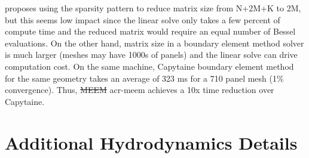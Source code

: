 \documentclass[a4paper,fleqn,colorlinks,unicode,lineno]{cas-dc} %
\makeatletter
\providecommand{\DIFdeltex}[1]{{\protect\color{red}\sout{#1}}} %
\providecommand{\DIFaddbegin}{} %
\providecommand{\DIFaddend}{} %
\providecommand{\DIFdelbegin}{} %
\providecommand{\DIFdelend}{} %
\providecommand{\DIFdel}[1]{\texorpdfstring{\DIFdeltex{#1}}{}} %
\providecommand{\DIFscaledelfig}{0.5}
\newlength{\DIFdelgraphicswidth} %
\newlength{\DIFdelgraphicsheight} %
\providecommand{\DIFaddincludegraphics}[2][]{{\color{blue}\fbox{\DIFOincludegraphics[#1]{#2}}}} %
\providecommand{\DIFdelincludegraphics}[2][]{%
\sbox{\DIFdelgraphicsbox}{\DIFOincludegraphics[#1]{#2}}%
\settoboxwidth{\DIFdelgraphicswidth}{\DIFdelgraphicsbox} %
\settoboxtotalheight{\DIFdelgraphicsheight}{\DIFdelgraphicsbox} %
\scalebox{\DIFscaledelfig}{%
\parbox[b]{\DIFdelgraphicswidth}{\usebox{\DIFdelgraphicsbox}\\[-\baselineskip] \rule{\DIFdelgraphicswidth}{0em}}\llap{\resizebox{\DIFdelgraphicswidth}{\DIFdelgraphicsheight}{%
\setlength{\unitlength}{\DIFdelgraphicswidth}%
\begin{picture}(1,1)%
\thicklines\linethickness{2pt} %
{\color[rgb]{1,0,0}\put(0,0){\framebox(1,1){}}}%
{\color[rgb]{1,0,0}\put(0,0){\line( 1,1){1}}}%
{\color[rgb]{1,0,0}\put(0,1){\line(1,-1){1}}}%
\end{picture}%
}\hspace*{3pt}}} %
} %
\DeclareRobustCommand{\DIFaddbegin}{\DIFOaddbegin \let\includegraphics\DIFaddincludegraphics} %
\DeclareRobustCommand{\DIFaddend}{\DIFOaddend \let\includegraphics\DIFOincludegraphics} %
\DeclareRobustCommand{\DIFdelbegin}{\DIFOdelbegin \let\includegraphics\DIFdelincludegraphics} %
\DeclareRobustCommand{\DIFdelend}{\DIFOaddend \let\includegraphics\DIFOincludegraphics} %
\let\sout@orig\sout %
\renewcommand{\sout}[1]{\ifmmode\text{\sout@orig{\ensuremath{#1}}}\else\sout@orig{#1}\fi} %
\makeatother
\begin{document}
\citet{chau_inertia_2012} proposes using the sparsity pattern to reduce matrix size from N+2M+K to 2M, but this seems low impact since the linear solve only takes a few percent of compute time and the reduced matrix would require an equal number of Bessel evaluations.
On the other hand, matrix size in a boundary element method solver is much larger (meshes may have 1000s of panels) and the linear solve can drive computation cost.
On the same machine, Capytaine boundary element method for the same geometry takes an average of 323 ms for a 710 panel mesh (1\% convergence). %
Thus, \DIFdelbegin \DIFdel{MEEM }\DIFdelend \DIFaddbegin \gls{acr-meem} \DIFaddend achieves a 10x time reduction over Capytaine.

\section{Additional Hydrodynamics Details}
\label{sec:appendix-additional-hydro}
\end{document}
